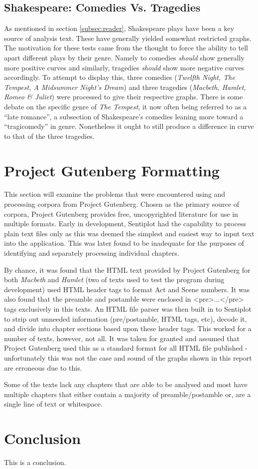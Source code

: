 \documentclass{article}
\begin{document}
    \subsection{Shakespeare: Comedies Vs. Tragedies}
    \label{subsec:comVsTrag}
        As mentioned in section \ref{subsec:reader}, Shakespeare plays have been a key source of analysis text. These have generally yielded somewhat restricted graphs. The motivation for these tests came from the thought to force the ability to tell apart different plays by their genre. Namely to comedies \textit{should} show generally more positive curves and similarly, tragedies \textit{should} show more negative curves accordingly. To attempt to display this, three comedies (\textit{Twelfth Night, The Tempest, A Midsummer Night's Dream}) and three tragedies (\textit{Macbeth, Hamlet, Romeo \& Juliet}) were processed to give their respective graphs. There is some debate on the specific genre of \textit{The Tempest}, it now often being referred to as a ``late romance'', a subsection of Shakespeare's comedies leaning more toward a ``tragicomedy'' in genre. Nonetheless it ought to still produce a difference in curve to that of the three tragedies.
\newpage
\section{Project Gutenberg Formatting}
\label{sec:gutenbergFormat}
        This section will examine the problems that were encountered using and processing corpora from Project Gutenberg. Chosen as the primary source of corpora, Project Gutenberg provides free, uncopyrighted literature for use in multiple formats. Early in development, Sentiplot had the capability to process plain text files only as this was deemed the simplest and easiest way to input text into the application. This was later found to be inadequate for the purposes of identifying and separately processing individual chapters.

        By chance, it was found that the HTML text provided by Project Gutenberg for both \textit{Macbeth} and \textit{Hamlet} (two of texts used to test the program during development) used HTML header tags to format Act and Scene numbers. It was also found that the preamble and postamble were enclosed in <pre>...</pre> tags exclusively in this texts. An HTML file parser was then built in to Sentiplot to strip out unneeded information (pre/postamble, HTML tags, etc), decode it, and divide into chapter sections based upon these header tags. This worked for a number of texts, however, not all. It was taken for granted and assumed that Project Gutenberg used this as a standard format for all HTML file published - unfortunately this was not the case and sound of the graphs shown in this report are erroneous due to this.
        
        Some of the texts lack any chapters that are able to be analysed and most have multiple chapters that either contain a majority of preamble/postamble or, are a single line of text or whitespace.
\newpage
\section{Conclusion}
	This is a conclusion.
\label{sec:conclusion}
\newpage


\end{document}
